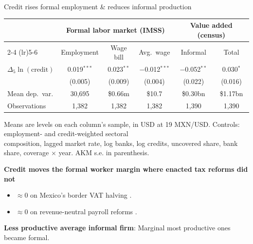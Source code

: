 \documentclass[aspectratio=169]{beamer}
\begin{document}
 
\begin{frame}{Credit rises formal employment \& reduces informal production}
 
\begin{center}
    {\small
    \begin{threeparttable}
        \begin{tabular}{lccccc}
            \toprule
             & \multicolumn{3}{c}{Formal labor market (IMSS)} & \multicolumn{2}{c}{Value added (census)} \\
            \cmidrule(lr){2-4} \cmidrule(lr){5-6}
             & Employment & Wage bill & Avg.\ wage & Informal & Total \\
            \midrule
            $\Delta_5 \ln(\text{credit})$ & 0.019$^{***}$ & 0.023$^{**}$ & $-$0.012$^{***}$ & $-$0.052$^{**}$ & 0.030$^{*}$ \\
             & (0.005) & (0.009) & (0.004) & (0.022) & (0.016) \\
            \addlinespace
            Mean dep.\ var. & 30{,}695 & \$0.66m & \$10.7 & \$0.30bn & \$1.17bn \\
            Observations             & 1{,}382  & 1{,}382 & 1{,}382 & 1{,}390 & 1{,}390 \\
            \bottomrule
        \end{tabular}
        \begin{tablenotes}[flushleft]
            \tiny
            \item Means are levels on each column's sample, in USD at 19 MXN/USD. Controls: employment- and credit-weighted sectoral \\
            composition, lagged market rate, log banks, log credits, uncovered share, bank share, coverage $\times$ year. AKM s.e. in parenthesis.
        \end{tablenotes}
    \end{threeparttable}
    }
\end{center}
\pause
 
\vspace{3mm}
 
\textbf{Credit moves the formal worker margin where enacted tax reforms did not}
\begin{itemize}
    \item $\approx 0$ on Mexico's border VAT halving \textcolor{gray}{\cite{campos2020effects}}.
    \item $\approx 0$ on revenue-neutral payroll reforms \textcolor{gray}{\cite{bobba2021labor}}.
\end{itemize}
 
\pause
 
\vspace{2mm}
 
\textbf{Less productive average informal firm}: Marginal most productive ones became formal.
 
\end{frame}
 
\end{document}

